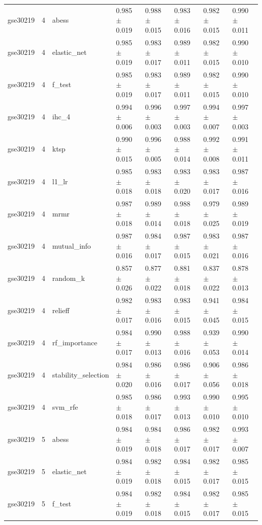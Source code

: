 \begin{table}[t]
\begin{tabular}{llllllll}
    gse30219 & 4 & abess & 0.985 $\pm$ 0.019 & 0.988 $\pm$ 0.015 & 0.983 $\pm$ 0.016 & 0.982 $\pm$ 0.015 & 0.990 $\pm$ 0.011 \\
    gse30219 & 4 & elastic\_net & 0.985 $\pm$ 0.019 & 0.983 $\pm$ 0.017 & 0.989 $\pm$ 0.011 & 0.982 $\pm$ 0.015 & 0.990 $\pm$ 0.010 \\
    gse30219 & 4 & f\_test & 0.985 $\pm$ 0.019 & 0.983 $\pm$ 0.017 & 0.989 $\pm$ 0.011 & 0.982 $\pm$ 0.015 & 0.990 $\pm$ 0.010 \\
    gse30219 & 4 & ihc\_4 & 0.994 $\pm$ 0.006 & 0.996 $\pm$ 0.003 & 0.997 $\pm$ 0.003 & 0.994 $\pm$ 0.007 & 0.997 $\pm$ 0.003 \\
    gse30219 & 4 & ktsp & 0.990 $\pm$ 0.015 & 0.996 $\pm$ 0.005 & 0.988 $\pm$ 0.014 & 0.992 $\pm$ 0.008 & 0.991 $\pm$ 0.011 \\
    gse30219 & 4 & l1\_lr & 0.985 $\pm$ 0.018 & 0.983 $\pm$ 0.018 & 0.983 $\pm$ 0.020 & 0.983 $\pm$ 0.017 & 0.987 $\pm$ 0.016 \\
    gse30219 & 4 & mrmr & 0.987 $\pm$ 0.018 & 0.989 $\pm$ 0.014 & 0.988 $\pm$ 0.018 & 0.979 $\pm$ 0.025 & 0.989 $\pm$ 0.019 \\
    gse30219 & 4 & mutual\_info & 0.987 $\pm$ 0.016 & 0.984 $\pm$ 0.017 & 0.987 $\pm$ 0.015 & 0.983 $\pm$ 0.021 & 0.987 $\pm$ 0.016 \\
    gse30219 & 4 & random\_k & 0.857 $\pm$ 0.026 & 0.877 $\pm$ 0.022 & 0.881 $\pm$ 0.018 & 0.837 $\pm$ 0.022 & 0.878 $\pm$ 0.013 \\
    gse30219 & 4 & relieff & 0.982 $\pm$ 0.017 & 0.983 $\pm$ 0.016 & 0.983 $\pm$ 0.015 & 0.941 $\pm$ 0.045 & 0.984 $\pm$ 0.015 \\
    gse30219 & 4 & rf\_importance & 0.984 $\pm$ 0.017 & 0.990 $\pm$ 0.013 & 0.988 $\pm$ 0.016 & 0.939 $\pm$ 0.053 & 0.990 $\pm$ 0.014 \\
    gse30219 & 4 & stability\_selection & 0.984 $\pm$ 0.020 & 0.986 $\pm$ 0.016 & 0.986 $\pm$ 0.017 & 0.906 $\pm$ 0.056 & 0.986 $\pm$ 0.018 \\
    gse30219 & 4 & svm\_rfe & 0.985 $\pm$ 0.018 & 0.986 $\pm$ 0.017 & 0.993 $\pm$ 0.013 & 0.990 $\pm$ 0.010 & 0.995 $\pm$ 0.010 \\
    gse30219 & 5 & abess & 0.984 $\pm$ 0.019 & 0.984 $\pm$ 0.018 & 0.986 $\pm$ 0.017 & 0.982 $\pm$ 0.017 & 0.993 $\pm$ 0.007 \\
    gse30219 & 5 & elastic\_net & 0.984 $\pm$ 0.019 & 0.982 $\pm$ 0.018 & 0.984 $\pm$ 0.015 & 0.982 $\pm$ 0.017 & 0.985 $\pm$ 0.015 \\
    gse30219 & 5 & f\_test & 0.984 $\pm$ 0.019 & 0.982 $\pm$ 0.018 & 0.984 $\pm$ 0.015 & 0.982 $\pm$ 0.017 & 0.985 $\pm$ 0.015 \\

\end{tabular}
\end{table}
